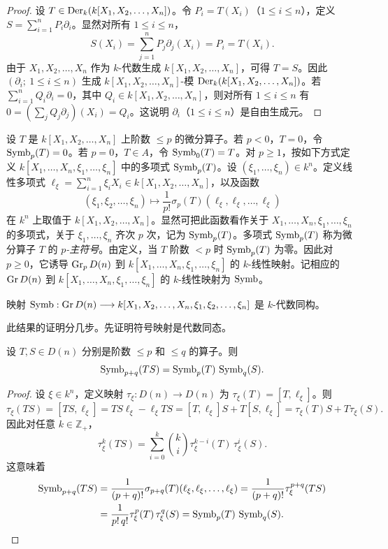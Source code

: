 \begin{proof}
设 $T\in\operatorname{Der}_k(k[X_1,X_2,\dots,X_n])$。令 $P_i=T(X_i)$（$1\le i\le n$），定义 $S=\sum_{i=1}^n P_i\partial_i$。显然对所有 $1\le i\le n$，
$$S(X_i)=\sum_{j=1}^n P_j\partial_j(X_i)=P_i=T(X_i).$$
由于 $X_1,X_2,\dots,X_n$ 作为 $k$-代数生成 $k[X_1,X_2,\dots,X_n]$，可得 $T=S$。因此 $(\partial_i;\ 1\le i\le n)$ 生成 $k[X_1,X_2,\dots,X_n]$-模 $\operatorname{Der}_k(k[X_1,X_2,\dots,X_n])$。若 $\sum_{i=1}^n Q_i\partial_i=0$，其中 $Q_i\in k[X_1,X_2,\dots,X_n]$，则对所有 $1\le i\le n$ 有 $0=(\sum_j Q_j\partial_j)(X_i)=Q_i$。这说明 $\partial_i$（$1\le i\le n$）是自由生成元。
\end{proof}

设 $T$ 是 $k[X_1,X_2,\dots,X_n]$ 上阶数 $\le p$ 的微分算子。若 $p<0$，$T=0$，令 $\operatorname{Symb}_p(T)=0$。若 $p=0$，$T\in A$，令 $\operatorname{Symb}_0(T)=T$。对 $p\ge 1$，按如下方式定义 $k[X_1,\dots,X_n,\xi_1,\dots,\xi_n]$ 中的多项式 $\operatorname{Symb}_p(T)$。设 $(\xi_1,\dots,\xi_n)\in k^n$。定义线性多项式 $\ell_\xi=\sum_{i=1}^n\xi_i X_i\in k[X_1,X_2,\dots,X_n]$，以及函数
$$(\xi_1,\xi_2,\dots,\xi_n)\longmapsto \frac{1}{p!}\sigma_p(T)(\ell_\xi,\ell_\xi,\dots,\ell_\xi)$$
在 $k^n$ 上取值于 $k[X_1,X_2,\dots,X_n]$。显然可把此函数看作关于 $X_1,\dots,X_n,\xi_1,\dots,\xi_n$ 的多项式，关于 $\xi_1,\dots,\xi_n$ 齐次 $p$ 次，记为 $\operatorname{Symb}_p(T)$。多项式 $\operatorname{Symb}_p(T)$ 称为微分算子 $T$ 的 \emph{$p$-主符号}。由定义，当 $T$ 阶数 $<p$ 时 $\operatorname{Symb}_p(T)$ 为零。因此对 $p\ge 0$，它诱导 $\operatorname{Gr}_p D(n)$ 到 $k[X_1,\dots,X_n,\xi_1,\dots,\xi_n]$ 的 $k$-线性映射。记相应的 $\operatorname{Gr} D(n)$ 到 $k[X_1,\dots,X_n,\xi_1,\dots,\xi_n]$ 的 $k$-线性映射为 $\operatorname{Symb}$。

\begin{theorem}
映射 $\operatorname{Symb}:\operatorname{Gr} D(n)\longrightarrow k[X_1,X_2,\dots,X_n,\xi_1,\xi_2,\dots,\xi_n]$ 是 $k$-代数同构。
\end{theorem}

此结果的证明分几步。先证明符号映射是代数同态。

\begin{lemma}
设 $T,S\in D(n)$ 分别是阶数 $\le p$ 和 $\le q$ 的算子。则
$$\operatorname{Symb}_{p+q}(TS)=\operatorname{Symb}_p(T)\,\operatorname{Symb}_q(S).$$
\end{lemma}

\begin{proof}
设 $\xi\in k^n$，定义映射 $\tau_\xi:D(n)\to D(n)$ 为 $\tau_\xi(T)=[T,\ell_\xi]$。则
$$\tau_\xi(TS)=[TS,\ell_\xi]=TS\ell_\xi-\ell_\xi TS=[T,\ell_\xi]S+T[S,\ell_\xi]=\tau_\xi(T)S+T\tau_\xi(S).$$
因此对任意 $k\in\mathbb{Z}_+$，
$$\tau_\xi^k(TS)=\sum_{i=0}^k\binom{k}{i}\tau_\xi^{k-i}(T)\,\tau_\xi^i(S).$$
这意味着
\begin{align*}
\operatorname{Symb}_{p+q}(TS)&=\frac{1}{(p+q)!}\sigma_{p+q}(T)(\ell_\xi,\ell_\xi,\dots,\ell_\xi)=\frac{1}{(p+q)!}\tau_\xi^{p+q}(TS)\\
&=\frac{1}{p!\,q!}\tau_\xi^p(T)\,\tau_\xi^q(S)=\operatorname{Symb}_p(T)\,\operatorname{Symb}_q(S).
\end{align*}
\end{proof}

